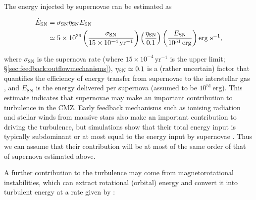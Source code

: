 The energy injected by supernovae can be estimated as

\setlength{\mathindent}{0pt}
\begin{footnotesize}

\begin{align}
    \dot{E}_{\rm SN} & =\sigma_\mathrm{SN}\eta_\mathrm{SN}E_\mathrm{SN} \nonumber \\
    & \simeq 5\times10^{39} \left( \frac{\sigma_\mathrm{SN}}{15\times10^{-4}\,\mathrm{yr}^{-1}} \right)\left( \frac{\eta_{\rm SN}}{0.1} \right)\left( \frac{E_\mathrm{SN}}{10^{51}\,\mathrm{erg}} \right)\mbox{${\rm erg}~{\rm s}^{-1}$},
\end{align}

\end{footnotesize}
%
where $\sigma_\mathrm{SN}$ is the supernova rate (where $15\times10^{-4}\,\mathrm{yr}^{-1}$ is the upper limit; \S\ref{sec:feedback:outflowmechanisms}), $\eta_{\rm SN} \simeq 0.1$ is a (rather uncertain) factor that quantifies the efficiency of energy transfer from supernovae to the interstellar gas \citep{MacLow2004}, and $E_\mathrm{SN}$ is the energy delivered per supernova (assumed to be $10^{51}$\,erg). This estimate indicates that supernovae may make an important contribution to turbulence in the CMZ. Early feedback mechanisms such as ionising radiation and stellar winds from massive stars also make an important contribution to driving the turbulence, but simulations show that their total energy input is typically subdominant or at most equal to the energy input by supernovae \citep[e.g.][]{Gatto2017}. Thus we can assume that their contribution will be at most of the same order of that of supernova estimated above.

A further contribution to the turbulence may come from magnetorotational instabilities, which can extract rotational (orbital) energy and convert it into turbulent energy  at a rate given by \citep{Sellwood1999}:

\setlength{\mathindent}{0pt}

